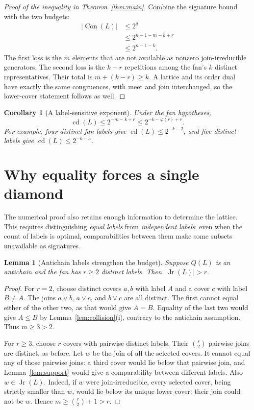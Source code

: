 \documentclass[11pt,a4paper]{article}
\numberwithin{equation}{section}
\newtheorem{lemma}[theorem]{Lemma}
\newtheorem{corollary}[theorem]{Corollary}
\theoremstyle{definition}
\theoremstyle{remark}
\DeclareMathOperator{\Con}{Con}
\DeclareMathOperator{\Jr}{Jr}
\DeclareMathOperator{\cdens}{cd}
\newcommand{\card}[1]{\lvert #1\rvert}
\begin{document}
\begin{proof}[Proof of the inequality in Theorem~\ref{thm:main}]
Combine the signature bound with the two budgets:
\begin{align*}
 \card{\Con(L)}
 &\le2^q\\
 &\le2^{n-1-m-k+r}\\
 &\le2^{n-1-k}.
\end{align*}
The first loss is the $m$ elements that are not available as nonzero
join-irreducible generators. The second loss is the $k-r$ repetitions among
the fan's $k$ distinct representatives. Their total is
$m+(k-r)\ge k$.
A lattice and its order dual have exactly the same congruences, with meet and
join interchanged, so the lower-cover statement follows as well.
\end{proof}

\begin{corollary}[A label-sensitive exponent]\label{cor:exponent}
Under the fan hypotheses,
\begin{equation}\label{eq:refined-exponent}
 \cdens(L)\le2^{-m-k+r}\le2^{-k-\varphi(r)+r}.
\end{equation}
For example, four distinct fan labels give $\cdens(L)\le2^{-k-2}$,
and five distinct labels give $\cdens(L)\le2^{-k-5}$.
\end{corollary}

\section{Why equality forces a single diamond}\label{sec:equality}
The numerical proof also retains enough information to determine the lattice.
This requires distinguishing \emph{equal labels} from \emph{independent labels}:
even when the count of labels is optimal, comparabilities between them make some
subsets unavailable as signatures.

\begin{lemma}[Antichain labels strengthen the budget]\label{lem:antichain-budget}
Suppose $Q(L)$ is an antichain and the fan has $r\ge2$ distinct labels.
Then $\card{\Jr(L)}>r$.
\end{lemma}
\begin{proof}
For $r=2$, choose distinct covers $a,b$ with label $A$ and a cover $c$ with label
$B\ne A$. The joins $a\vee b$, $a\vee c$, and $b\vee c$ are all distinct.
The first cannot equal either of the other two, as that would give $A=B$.
Equality of the last two would give $A\le B$ by
Lemma~\ref{lem:collision}(i), contrary to the antichain assumption.
Thus $m\ge3>2$.

For $r\ge3$, choose $r$ covers with pairwise distinct labels.
Their $\binom r2$ pairwise joins are distinct, as before.
Let $w$ be the join of all the selected covers. It cannot equal any of those
pairwise joins: a third cover would lie below that pairwise join, and
Lemma~\ref{lem:support} would give a comparability between different labels.
Also $w\in\Jr(L)$. Indeed, if $w$ were join-irreducible, every selected cover,
being strictly smaller than $w$, would lie below its unique lower cover;
their join could not be $w$.
Hence $m\ge\binom r2+1>r$.
\end{proof}
\end{document}
